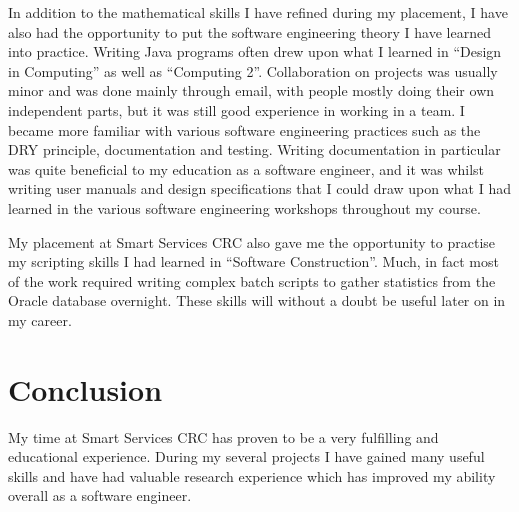 \documentclass{report}
\begin{document}
In addition to the mathematical skills I have refined during my placement, I have also had the opportunity to put the software engineering theory I have learned into practice. Writing Java programs often drew upon what I learned in ``Design in Computing'' as well as ``Computing 2''. Collaboration on projects was usually minor and was done mainly through email, with people mostly doing their own independent parts, but it was still good experience in working in a team. I became more familiar with various software engineering practices such as the DRY principle, documentation and testing. Writing documentation in particular was quite beneficial to my education as a software engineer, and it was whilst writing user manuals and design specifications that I could draw upon what I had learned in the various software engineering workshops throughout my course.

My placement at Smart Services CRC also gave me the opportunity to practise my scripting skills I had learned in ``Software Construction''. Much, in fact most of the work required writing complex batch scripts to gather statistics from the Oracle database overnight. These skills will without a doubt be useful later on in my career.


\chapter{Conclusion}
My time at Smart Services CRC has proven to be a very fulfilling and educational experience. During my several projects I have gained many useful skills and have had valuable research experience which has improved my ability overall as a software engineer.
\end{document}
